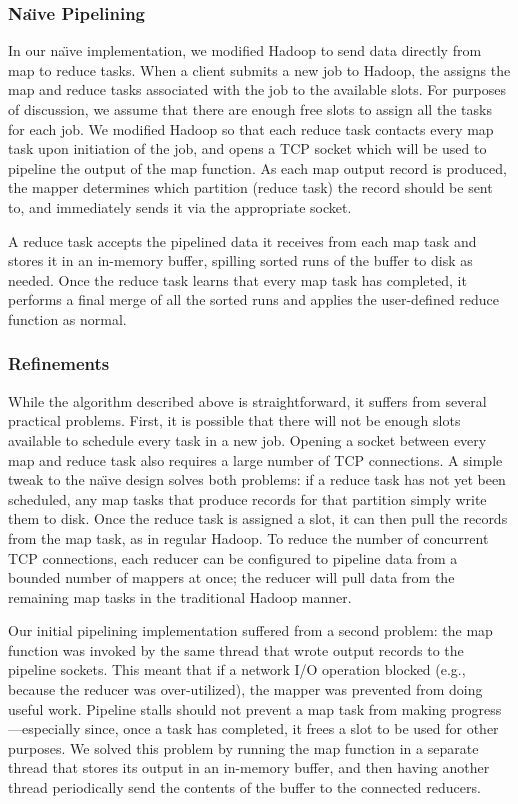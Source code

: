 \subsubsection{Na\"{\i}ve Pipelining}
\label{sec:naive}
In our na\"{\i}ve implementation, we modified Hadoop to send data directly from
map to reduce tasks. When a client submits a new job to Hadoop, the {\JT}
assigns the map and reduce tasks associated with the job to the available {\TT}
slots. For purposes of discussion, we assume that there are enough free slots to
assign all the tasks for each job. We modified Hadoop so that each reduce task
contacts every map task upon initiation of the job, and opens a TCP socket which
will be used to pipeline the output of the map function. As each map output
record is produced, the mapper determines which partition (reduce task) the
record should be sent to, and immediately sends it via the appropriate socket.

A reduce task accepts the pipelined data it receives from each map task and
stores it in an in-memory buffer, spilling sorted runs of the buffer to disk as
needed. Once the reduce task learns that every map task has completed, it
performs a final merge of all the sorted runs and applies the user-defined
reduce function as normal.

\subsubsection{Refinements}
\label{sec:pipe-refine}
While the algorithm described above is straightforward, it suffers
from several practical problems. First, it is possible that there will
not be enough slots available to schedule every task in a new
job. Opening a socket between every map and reduce task also requires
a large number of TCP connections. A simple tweak to the na\"{\i}ve
design solves both problems: if a reduce task has not yet been
scheduled, any map tasks that produce records for that partition
simply write them to disk. Once the reduce task is assigned a slot, it
can then pull the records from the map task, as in regular Hadoop.  To
reduce the number of concurrent TCP connections, each reducer can be
configured to pipeline data from a bounded number of mappers at once; the
reducer will pull data from the remaining map tasks in the traditional
Hadoop manner.

Our initial pipelining implementation suffered from a second problem: the map
function was invoked by the same thread that wrote output records to the
pipeline sockets. This meant that if a network I/O operation blocked (e.g.,
because the reducer was over-utilized), the mapper was prevented from doing
useful work. Pipeline stalls should not prevent a map task from making
progress---especially since, once a task has completed, it frees a {\TT} slot
to be used for other purposes. We solved this problem by running the map
function in a separate thread that stores its output in an in-memory buffer, and
then having another thread periodically send the contents of the buffer to the
connected reducers.

